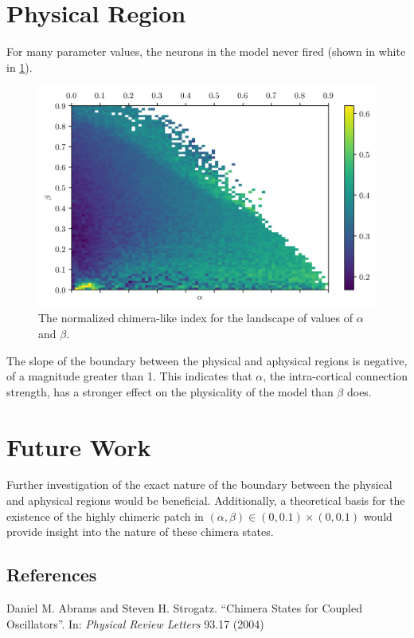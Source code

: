 \documentclass{beamer}
\newcommand{\hra}{\alpha}
\newcommand{\hrb}{\beta}
\begin{document}
\begin{frame}[t]
\begin{multicols}{3}
    \section{Physical Region}
    For many parameter values, the neurons in the model never fired (shown in white in \cref{fig:landscape}).
    \begin{figure}
      \centering
    \includegraphics[width=\columnwidth]{figure/landscape}
      \caption{The normalized chimera-like index for the landscape of values of $\hra$ and $\hrb$.}
      \label{fig:landscape}
    \end{figure}
    The slope of the boundary between the physical and aphysical regions is negative, of a magnitude greater than 1.
    This indicates that $\hra$, the intra-cortical connection strength, has a stronger effect on the physicality of the model than $\hrb$ does.

    \section{Future Work}
    Further investigation of the exact nature of the boundary between the physical and aphysical regions would be beneficial.
    Additionally, a theoretical basis for the existence of the highly chimeric patch in
    $(\hra, \hrb) \in (0, 0.1) \times (0, 0.1)$
    would provide insight into the nature of these chimera states.


    \subsection{References}
    \begin{thebibliography}{99}
     Daniel M. Abrams and Steven H. Strogatz. ``Chimera States for Coupled Oscillators''.
      In: \textit{Physical Review Letters} 93.17 (2004)


\end{thebibliography}
\end{multicols}
\end{frame}
\end{document}
